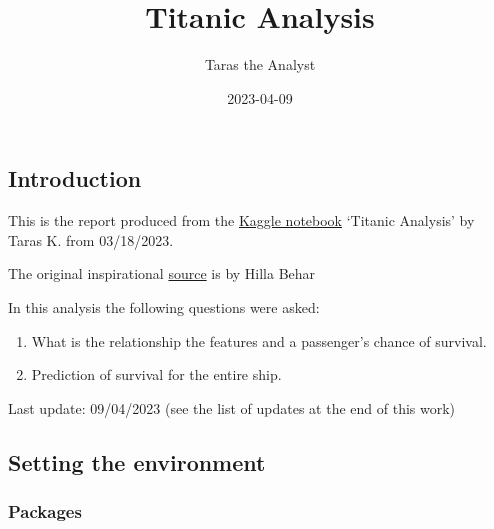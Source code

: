 \documentclass[
]{article}
\title{Titanic Analysis}
\author{Taras the Analyst}
\date{2023-04-09}
\providecommand{\tightlist}{%
  \setlength{\itemsep}{0pt}\setlength{\parskip}{0pt}}
\begin{document}
\maketitle

\hypertarget{introduction}{%
\subsection{Introduction}\label{introduction}}

This is the report produced from the
\href{https://www.kaggle.com/code/taraskhamardiuk/getting-the-titanic-started-with-r-3rd-playbook}{Kaggle
notebook} `Titanic Analysis' by Taras K. from 03/18/2023.

The original inspirational
\href{https://www.kaggle.com/code/hillabehar/titanic-analysis-with-r/report}{source}
is by Hilla Behar

In this analysis the following questions were asked:

\begin{enumerate}
\def\labelenumi{\arabic{enumi}.}
\tightlist
\item
  What is the relationship the features and a passenger's chance of
  survival.
\item
  Prediction of survival for the entire ship.
\end{enumerate}

Last update: 09/04/2023 (see the list of updates at the end of this
work)

\hypertarget{setting-the-environment}{%
\subsection{Setting the environment}\label{setting-the-environment}}

\hypertarget{packages}{%
\subsubsection{Packages}\label{packages}}
\end{document}
